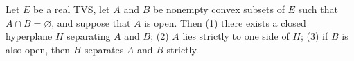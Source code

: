 Let $E$ be a real TVS, let $A$ and $B$ be nonempty convex subsets of $E$ such that $A \cap B = \varnothing$, and suppose that $A$ is open. Then (1) there exists a closed hyperplane $H$ separating $A$ and $B$; (2) $A$ lies strictly to one side of $H$; (3) if $B$ is also open, then $H$ separates $A$ and $B$ strictly.